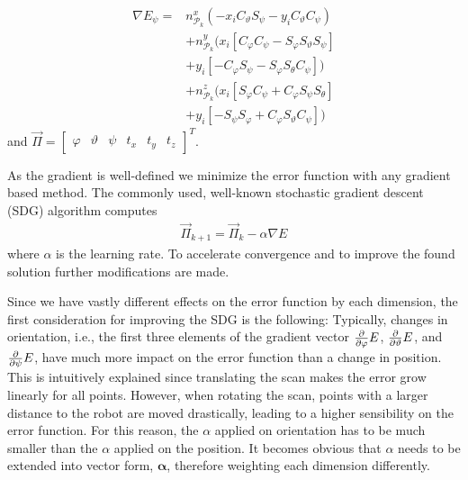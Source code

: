 \begin{equation}
\begin{split}
	\nabla E_\psi = &n_{\mathcal{P}_k}^x\left(-x_iC_\vartheta S_\psi - y_iC_\vartheta C_\psi\right) \\
       &+ n_{\mathcal{P}_k}^y(x_i[C_\varphi C_\psi - S_\varphi S_\vartheta S_\psi]\\
       &+ y_i[-C_\varphi S_\psi - S_\varphi S_\theta C_\psi]) \\
       &+ n_{\mathcal{P}_k}^z(x_i[S_\varphi C_\psi + C_\varphi S_\psi S_\theta] \\
       &+ y_i[-S_\psi S_ \varphi + C_\varphi S_\vartheta C_\psi]) 
\end{split}
\end{equation}
and $\vec{\Pi}=\begin{bmatrix}\varphi & \vartheta & \psi & t_x & t_y & t_z\end{bmatrix}^T$.

As the gradient is well-defined we minimize the error function with any gradient based method. 
The commonly used, well-known stochastic gradient descent (SDG) algorithm computes 
\begin{align}
    \vec{\Pi}_{k+1} = \vec{\Pi}_{k} - \alpha \nabla E
\end{align}
where $\alpha$ is the learning rate.
To accelerate convergence and to improve the found solution further modifications are made.

Since we have vastly different effects on the error function by each dimension, the first consideration for improving the SDG is the following:
Typically, changes in orientation, i.e., the first three elements of the gradient vector $\frac{\partial}{\partial \varphi}E$, $\frac{\partial}{\partial \vartheta}E$, and $\frac{\partial}{\partial \psi}E$, have much more impact on the error function than a change in position.
This is intuitively explained since translating the scan makes the error grow linearly for all points.
However, when rotating the scan, points with a larger distance to the robot are moved drastically, leading to a higher sensibility on the error function.
For this reason, the $\alpha$ applied on orientation has to be much smaller than the $\alpha$ applied on the position.
It becomes obvious that $\alpha$ needs to be extended into vector form, $\boldsymbol\alpha$, therefore weighting each dimension differently.

